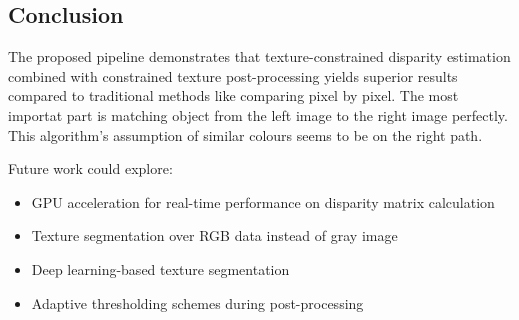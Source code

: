 \documentclass[12pt]{article}
\begin{document}
\begin{multicols}{2}
\section{Conclusion}

The proposed pipeline demonstrates that texture-constrained disparity estimation combined with constrained texture post-processing yields superior results compared to traditional methods
like comparing pixel by pixel. The most importat part is matching object from the left image to the right image perfectly. This algorithm's assumption of similar colours seems to be
on the right path.

Future work could explore:

\begin{itemize}
    \item GPU acceleration for real-time performance on disparity matrix calculation
    \item Texture segmentation over RGB data instead of gray image
    \item Deep learning-based texture segmentation
    \item Adaptive thresholding schemes during post-processing
\end{itemize}

\end{multicols}

\newpage
\end{document}
